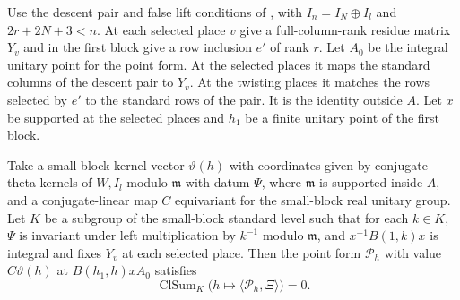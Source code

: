 \begin{lemma}
\label{lem:c-false-point-period}
\emitthmsource
Use the descent pair and false lift conditions of , with $I_n=I_N\oplus I_l$ and $2r+2N+3<n$. At each selected place $v$ give a full-column-rank residue matrix $Y_v$ and in the first block give a row inclusion $e'$ of rank $r$. Let $A_0$ be the integral unitary point for the point form. At the selected places it maps the standard columns of the descent pair to $Y_v$. At the twisting places it matches the rows selected by $e'$ to the standard rows of the pair. It is the identity outside $A$. Let $x$ be supported at the selected places and $h_1$ be a finite unitary point of the first block.

Take a small-block kernel vector $\vartheta(h)$ with coordinates given by conjugate theta kernels of $W,I_l$ modulo $\mathfrak m$ with datum $\Psi$, where $\mathfrak m$ is supported inside $A$, and a conjugate-linear map $C$ equivariant for the small-block real unitary group. Let $K$ be a subgroup of the small-block standard level such that for each $k\in K$, $\Psi$ is invariant under left multiplication by $k^{-1}$ modulo $\mathfrak m$, and $x^{-1}B(1,k)x$ is integral and fixes $Y_v$ at each selected place. Then the point form $\mathcal P_h$ with value $C\vartheta(h)$ at $B(h_1,h)xA_0$ satisfies
\[
    \operatorname{ClSum}_{K}\bigl(h\mapsto
             \langle\mathcal P_h,\Xi\rangle\bigr)=0 .
\]
\end{lemma}


